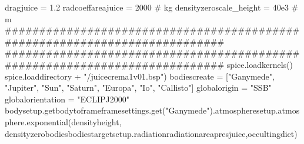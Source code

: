 {}
\markdownRendererSectionEnd \markdownRendererSectionBegin
{}\markdownRendererInterblockSeparator
{}
\markdownRendererSectionEnd \markdownRendererSectionBegin
{}\markdownRendererInterblockSeparator
{}
\markdownRendererSectionEnd \markdownRendererSectionBegin
{}\markdownRendererInterblockSeparator
{}dragjuice = 1.2 radcoeffareajuice = 2000 # kg\markdownRendererInterblockSeparator
{}
\markdownRendererSectionEnd \markdownRendererSectionBegin
{}\markdownRendererInterblockSeparator
{}densityzeroscale_height = 40e3 # m\markdownRendererInterblockSeparator
{}###########################################################################\markdownRendererInterblockSeparator
{}
\markdownRendererSectionEnd \markdownRendererSectionBegin
{}\markdownRendererInterblockSeparator
{}###########################################################################\markdownRendererInterblockSeparator
{}
\markdownRendererSectionEnd \markdownRendererSectionBegin
{}\markdownRendererInterblockSeparator
{}spice.loadkernels() spice.loaddirectory + "/juicecrema1v01.bsp")\markdownRendererInterblockSeparator
{}
\markdownRendererSectionEnd \markdownRendererSectionBegin
{}\markdownRendererInterblockSeparator
{}bodiescreate = ["Ganymede", "Jupiter", "Sun", "Saturn", "Europa", "Io", "Callisto"] globalorigin = "SSB" globalorientation = "ECLIPJ2000" bodysetup.getbodytoframeframesettings.get("Ganymede").atmospheresetup.atmosphere.exponential(densityheight, densityzerobodiesbodiestargetsetup.radiationradiationareapresjuice,occultingdict)\markdownRendererInterblockSeparator
